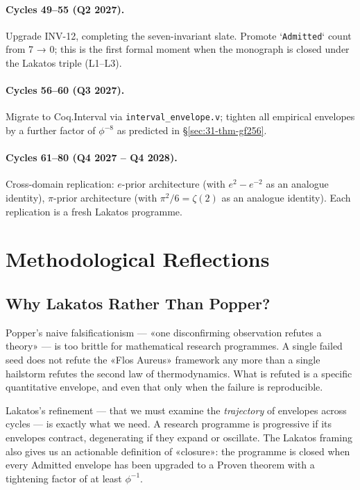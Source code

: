 \paragraph{Cycles 49–55 (Q2 2027).} Upgrade INV-12, completing the seven-invariant slate. Promote `\texttt{Admitted}` count from 7 → 0; this is the first formal moment when the monograph is closed under the Lakatos triple (L1–L3).

\paragraph{Cycles 56–60 (Q3 2027).} Migrate to Coq.Interval via \texttt{interval\_envelope.v}; tighten all empirical envelopes by a further factor of $\phi^{-8}$ as predicted in §\ref{sec:31-thm-gf256}.

\paragraph{Cycles 61–80 (Q4 2027 – Q4 2028).} Cross-domain replication: $e$-prior architecture (with $e^{2} - e^{-2}$ as an analogue identity), $\pi$-prior architecture (with $\pi^{2}/6 = \zeta(2)$ as an analogue identity). Each replication is a fresh Lakatos programme.

\section{Methodological Reflections}
\label{sec:31-reflections}

\subsection{Why Lakatos Rather Than Popper?}
\label{sec:31-lakatos-vs-popper}

Popper's naive falsificationism — «one disconfirming observation refutes a theory» — is too brittle for mathematical research programmes. A single failed seed does not refute the «Flos Aureus» framework any more than a single hailstorm refutes the second law of thermodynamics. What is refuted is a specific quantitative envelope, and even that only when the failure is reproducible.

Lakatos's refinement — that we must examine the \emph{trajectory} of envelopes across cycles — is exactly what we need. A research programme is progressive if its envelopes contract, degenerating if they expand or oscillate. The Lakatos framing also gives us an actionable definition of «closure»: the programme is closed when every Admitted envelope has been upgraded to a Proven theorem with a tightening factor of at least $\phi^{-1}$.

